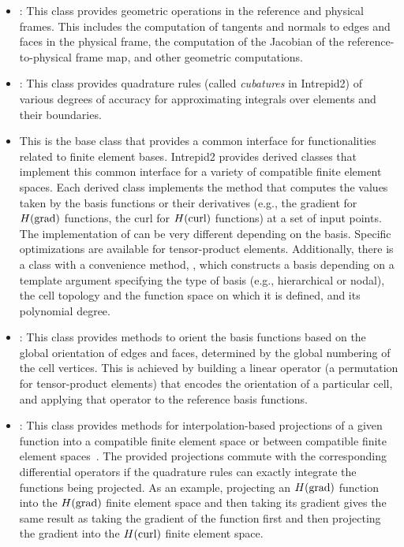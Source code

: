 \begin{itemize}
\item {}: This class provides geometric operations in the reference and physical frames. This includes the computation of tangents and normals to edges and faces in the physical frame, the computation of the Jacobian of the reference-to-physical frame map, and other geometric computations. 
\item {}: This class provides quadrature rules (called \emph{cubatures} in Intrepid2) of various degrees of accuracy for approximating integrals over elements and their boundaries.
\item {} This is the base class that provides a common interface for functionalities related to finite element bases. Intrepid2 provides derived classes that implement this common interface for a variety of compatible finite element spaces. Each derived class implements the  method that computes the values taken by the basis functions or their derivatives (e.g., the gradient for $H({\rm grad})$ functions, the curl for $H({\rm curl})$ functions) at a set of input points. The implementation of  can be very different depending on the basis. Specific optimizations are available for tensor-product elements.  Additionally, there is a  class with a convenience method, , which constructs a basis depending on a template argument specifying the type of basis (e.g., hierarchical or nodal), the cell topology and the function space on which it is defined, and its polynomial degree.
\item {}: This class provides methods to orient the basis functions based on the global orientation of edges and faces, determined by the global numbering of the cell vertices. This is achieved by building a linear operator (a permutation for tensor-product elements) that encodes the orientation of a particular cell, and applying that operator to the reference basis functions.
\item {}: This class provides methods for interpolation-based projections of a given function into a compatible finite element space or between compatible finite element spaces~\cite{demkowicz2007}.  The provided projections commute with the corresponding differential operators if the quadrature rules can exactly integrate the functions being projected. As an example, projecting an $H({\rm grad})$ function into the $H({\rm grad})$ finite element space and then taking its gradient gives the same result as taking the gradient of the function first and then projecting the gradient into the $H({\rm curl})$ finite element space.

\end{itemize}
